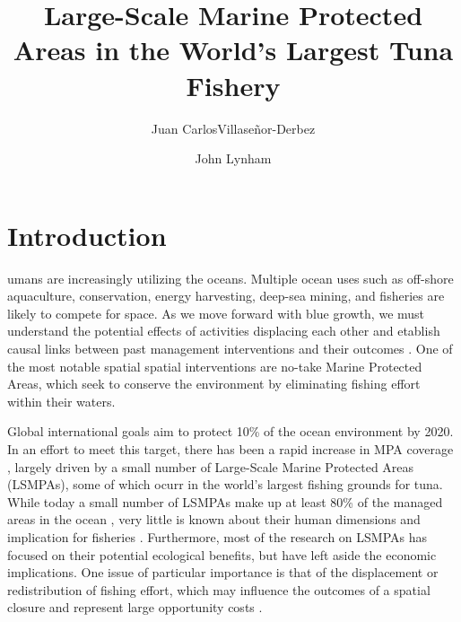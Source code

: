 \documentclass[9p,twocolumn,twoside,lineno]{pnas-new}
\title{Large-Scale Marine Protected Areas in the World's Largest Tuna Fishery}
\author[a,1]{Juan CarlosVillase\~{n}or-Derbez}
\author[b]{John Lynham}
\affil[a]{Bren School of Environmental Science \& Management, University of California at Santa Barbara, Santa Barbara, CA}
\affil[b]{Department of Economics, University of Hawaii at Manoa, Honolulu, HI}
\begin{document}
\maketitle
\thispagestyle{firststyle}


\section{Introduction}\label{introduction}

umans are increasingly utilizing the oceans. Multiple ocean uses such as off-shore aquaculture, conservation, energy harvesting, deep-sea mining, and fisheries are likely to compete for space. As we move forward with blue growth, we must understand the potential effects of activities displacing each other and etablish causal links between past management interventions and their outcomes \citep{burgess_2018}. One of the most notable spatial spatial interventions are no-take Marine Protected Areas, which seek to conserve the environment by eliminating fishing effort within their waters.

Global international goals aim to protect 10\% of the ocean environment by 2020. In an effort to meet this target, there has been a rapid increase in MPA coverage \citep{wood_2008,sala_2018}, largely driven by a small number of Large-Scale Marine Protected Areas (LSMPAs), some of which ocurr in the world's largest fishing grounds for tuna. While today a small number of LSMPAs make up at least 80\% of the managed areas in the ocean \citep{toonen_2013}, very little is known about their human dimensions and implication for fisheries \citep{gray_2017}. Furthermore, most of the research on LSMPAs has focused on their potential ecological benefits, but have left aside the economic implications. One issue of particular importance is that of the displacement or redistribution of fishing effort, which may influence the outcomes of a spatial closure and represent large opportunity costs \citep{smith_2003,smith_2010}.
\end{document}
